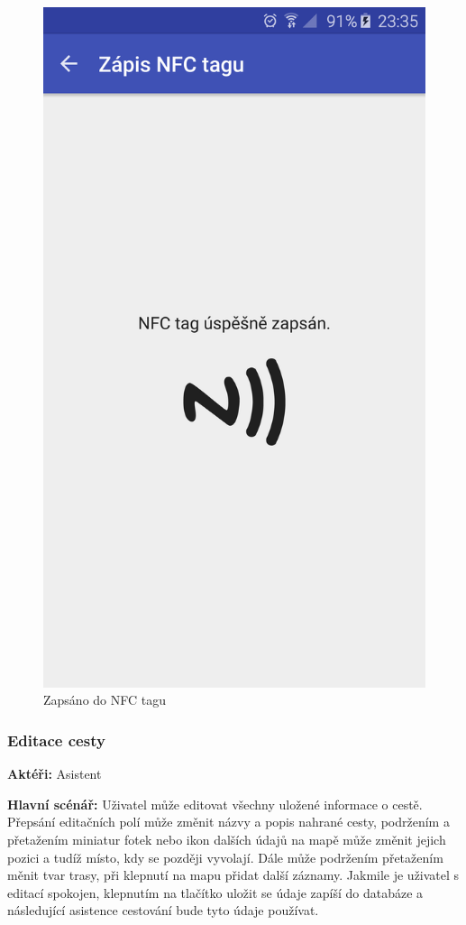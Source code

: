 \documentclass[czech,master,public,dept460,male,java,cpdeclaration]{diploma}
\newcommand{\usecase}[2]{\subsubsection{#1}\label{#2}}
\begin{document}
\begin{figure}[H]
\begin{minipage}{.5\textwidth}
                    \includegraphics[scale=0.14]{img/screen/zapisdonfc.png}
            \caption{Zapsáno do NFC tagu}
            \label{fig:nfczapsano}

       \end{minipage}
\end{figure}



\usecase{Editace cesty}{editacecesty}
\textbf{Aktéři:} Asistent

\vspace{0.1cm}
\noindent
\textbf{Hlavní scénář:} Uživatel může editovat všechny uložené informace o cestě. Přepsání editačních
polí může změnit názvy a popis nahrané cesty, podržením a přetažením miniatur fotek nebo ikon dalších údajů na mapě může změnit
jejich pozici a tudíž místo, kdy se později vyvolají. Dále může podržením přetažením měnit tvar trasy,
při klepnutí na mapu přidat další záznamy. Jakmile je uživatel s editací spokojen, klepnutím na tlačítko
uložit se údaje zapíší do databáze a následující asistence cestování bude tyto údaje používat.
\end{document}
